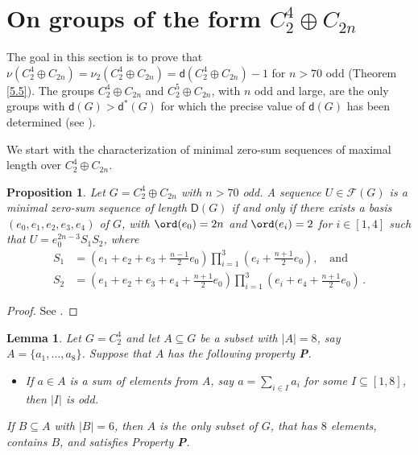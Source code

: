 \documentclass[a4paper, 10pt]{amsart}
\theoremstyle{plain}
\newtheorem{proposition}[theorem]{\bf Proposition}
\newtheorem{lemma}[theorem]{\bf Lemma}
\theoremstyle{definition}
\numberwithin{equation}{section}
\begin{document}
{\smallskip
\section{On groups of the form  $C_2^4 \oplus C_{2n}$} \label{5}
\smallskip

The goal in this section is to prove that $\nu (C_2^4 \oplus C_{2n}) = \nu_2 (C_2^4 \oplus C_{2n}) = \mathsf d (C_2^4 \oplus C_{2n}) - 1$ for $n > 70$ odd (Theorem \ref{5.5}). The groups $C_2^4 \oplus C_{2n}$ and $C_2^5 \oplus C_{2n}$, with $n$ odd and large, are the only groups  with $\mathsf d (G) > \mathsf d^* (G)$ for which the precise value of $\mathsf d (G)$ has been determined (see \cite{Sa-Ch14a, Zh23a}).



We start with the characterization of minimal zero-sum sequences of maximal length over $C_2^4 \oplus C_{2n}$.


\begin{proposition} \label{5.1}
Let $G=C_2^4\oplus C_{2n}$ with $n>70$ odd. A sequence $U \in \mathcal F (G)$   is a minimal zero-sum sequence of  length $\mathsf D(G)$ if and only if there exists a basis $(e_0, e_1,e_2,e_3,e_4)$ of $G$, with  $\ord (e_0)=2n$ and $\ord (e_i)=2$ for $i \in [1,4]$  such that $U=e_0^{2n-3}S_1S_2$, where
\[
\begin{aligned}
S_1 & = (e_1+e_2+e_3+\frac{n-1}{2} e_0)\prod_{i=1}^{3}(e_i+\frac{n+1}{2} e_0), \quad \text{and} \\
S_2 & = (e_1+e_2+e_3+e_4+\frac{n+1}{2}e_0)\prod_{i=1}^{3}(e_i+e_4+\frac{n+1}{2} e_0) \,.
\end{aligned}
\]
\end{proposition}

\begin{proof}
See \cite{Sa-Ch14a}.
\end{proof}


\begin{lemma} \label{5.2}
Let $G = C_2^4$ and let $A \subseteq G$ be a subset with $|A|=8$, say $A = \{a_1, \ldots, a_8\}$. Suppose that $A$ has the following property {\bf P}. 
\begin{itemize}
\item[{\bf P.}]If $a \in A$ is a sum of elements from $A$, say $a = \sum_{i \in I} a_i$ for some $I \subseteq [1,8]$, then $|I|$ is odd.
\end{itemize}    
If $B \subseteq A$ with $|B|=6$, then $A$ is the only subset of $G$, that has $8$ elements, contains $B$, and satisfies Property {\bf P}.
\end{lemma}

}
\end{document}
